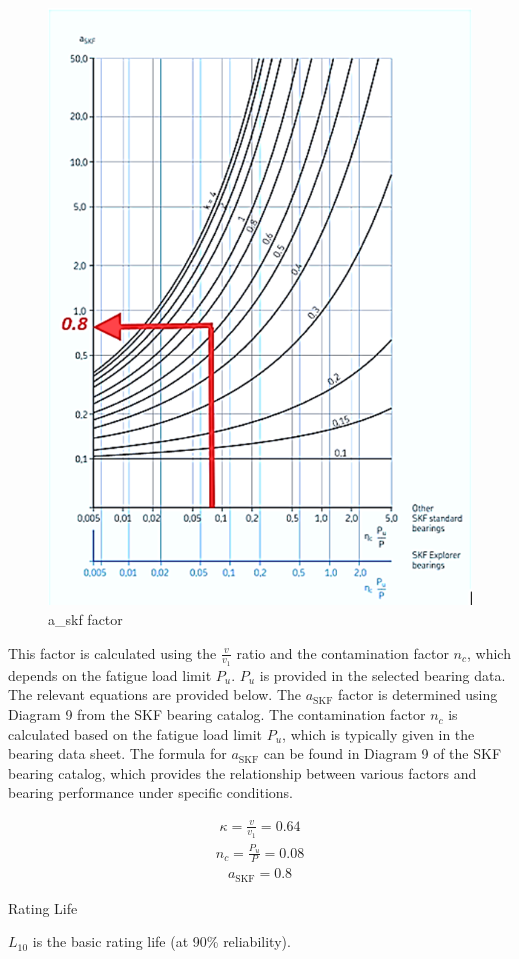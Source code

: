 \documentclass[12pt]{report}
\begin{document}
\begin{figure}[h!]
    \centering
    \includegraphics[width=0.6\linewidth]{a_skf.png}
    \caption{a\_skf factor}
    \label{fig:a_skf factor}
\end{figure}


This factor is calculated using the \( \frac{v}{v_1} \) ratio and the contamination factor \( n_c \), which depends on the fatigue load limit \( P_u \). \( P_u \) is provided in the selected bearing data. The relevant equations are provided below. The \( a_{\text{SKF}} \) factor is determined using Diagram 9 from the SKF bearing catalog. The contamination factor \( n_c \) is calculated based on the fatigue load limit \( P_u \), which is typically given in the bearing data sheet. The formula for \( a_{\text{SKF}} \) can be found in Diagram 9 of the SKF bearing catalog, which provides the relationship between various factors and bearing performance under specific conditions.

\begin{align}
\kappa = \frac{v}{v_1} = 0.64
\end{align}
\begin{align}
n_c = \frac{P_u}{P} = 0.08
\end{align}
\begin{align}
a_{\text{SKF}} = 0.8
\end{align}

Rating Life

\( L_{10} \) is the basic rating life (at 90\% reliability).
\end{document}
